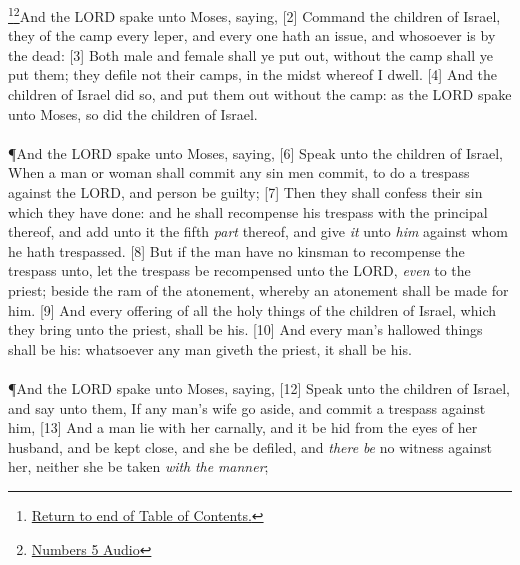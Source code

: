 \footnote{\textcolor[cmyk]{0.99998,1,0,0}{\hyperlink{TOC}{Return to end of Table of Contents.}}}\footnote{\href{https://audiobible.com/bible/numbers_5.html}{\textcolor[cmyk]{0.99998,1,0,0}{Numbers 5 Audio}}}\textcolor[cmyk]{0.99998,1,0,0}{And the LORD spake unto Moses, saying,}
[2] \textcolor[cmyk]{0.99998,1,0,0}{Command the children of Israel,  they  of the camp every leper, and every one  hath an issue, and whosoever is  by the dead:}
[3] \textcolor[cmyk]{0.99998,1,0,0}{Both male and female shall ye put out, without the camp shall ye put them;  they defile not their camps, in the midst whereof I dwell.}
[4] \textcolor[cmyk]{0.99998,1,0,0}{And the children of Israel did so, and put them out without the camp: as the LORD spake unto Moses, so did the children of Israel.}\\
\\
\P \textcolor[cmyk]{0.99998,1,0,0}{And the LORD spake unto Moses, saying,}
[6] \textcolor[cmyk]{0.99998,1,0,0}{Speak unto the children of Israel, When a man or woman shall commit any sin  men commit, to do a trespass against the LORD, and  person be guilty;}
[7] \textcolor[cmyk]{0.99998,1,0,0}{Then they shall confess their sin which they have done: and he shall recompense his trespass with the principal thereof, and add unto it the fifth \emph{part} thereof, and give \emph{it} unto \emph{him} against whom he hath trespassed.}
[8] \textcolor[cmyk]{0.99998,1,0,0}{But if the man have no kinsman to recompense the trespass unto, let the trespass be recompensed unto the LORD, \emph{even} to the priest; beside the ram of the atonement, whereby an atonement shall be made for him.}
[9] \textcolor[cmyk]{0.99998,1,0,0}{And every offering of all the holy things of the children of Israel, which they bring unto the priest, shall be his.}
[10] \textcolor[cmyk]{0.99998,1,0,0}{And every man's hallowed things shall be his: whatsoever any man giveth the priest, it shall be his.}\\
\\
\P \textcolor[cmyk]{0.99998,1,0,0}{And the LORD spake unto Moses, saying,}
[12] \textcolor[cmyk]{0.99998,1,0,0}{Speak unto the children of Israel, and say unto them, If any man's wife go aside, and commit a trespass against him,}
[13] \textcolor[cmyk]{0.99998,1,0,0}{And a man lie with her carnally, and it be hid from the eyes of her husband, and be kept close, and she be defiled, and \emph{there} \emph{be} no witness against her, neither she be taken \emph{with} \emph{the} \emph{manner};}
